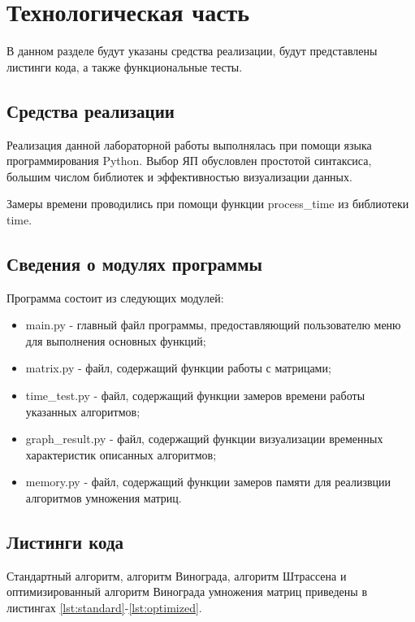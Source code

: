 \chapter{Технологическая часть}

В данном разделе будут указаны средства реализации, будут представлены листинги кода, а также функциональные тесты.

\section{Средства реализации}

Реализация данной лабораторной работы выполнялась при помощи языка программирования Python. Выбор ЯП обусловлен простотой синтаксиса, большим числом библиотек и эффективностью визуализации данных.

Замеры времени проводились при помощи функции process\_time из библиотеки time.

\section{Сведения о модулях программы}

Программа состоит из следующих модулей:

\begin{itemize}
	\item main.py - главный файл программы, предоставляющий пользователю меню для выполнения основных функций;
	\item matrix.py - файл, содержащий функции работы с матрицами;
	\item time\_test.py - файл, содержащий функции замеров времени работы указанных алгоритмов;
	\item graph\_result.py - файл, содержащий функции визуализации временных характеристик описанных алгоритмов;
	\item memory.py - файл, содержащий функции замеров памяти для реализвции алгоритмов умножения матриц.
\end{itemize}

\section{Листинги кода}

Стандартный алгоритм, алгоритм Винограда, алгоритм Штрассена и оптимизированный алгоритм Винограда умножения матриц приведены в листингах \ref{lst:standard}-\ref{lst:optimized}.

